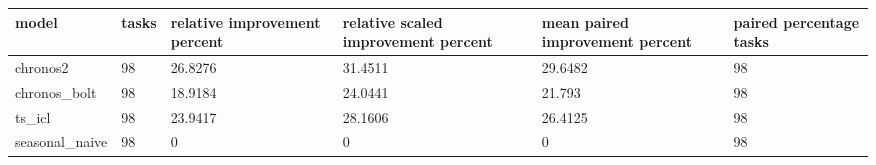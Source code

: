 \begin{tabular}{llllll}
\toprule
model & tasks & relative improvement percent & relative scaled improvement percent & mean paired improvement percent & paired percentage tasks \\
\midrule
chronos2 & 98 & 26.8276 & 31.4511 & 29.6482 & 98 \\
chronos\_bolt & 98 & 18.9184 & 24.0441 & 21.793 & 98 \\
ts\_icl & 98 & 23.9417 & 28.1606 & 26.4125 & 98 \\
seasonal\_naive & 98 & 0 & 0 & 0 & 98 \\
\bottomrule
\end{tabular}
